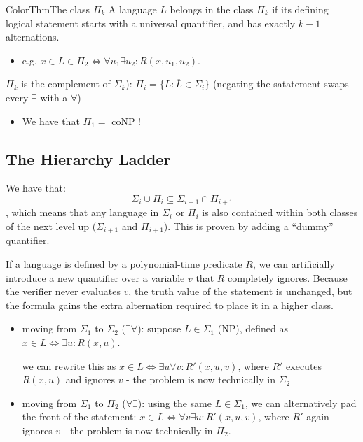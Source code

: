 \documentclass[a4paper, 11pt]{report}
\begin{document}
\begin{cframe}{ColorThm}{The class $\Pi_{k}$}{}
A language $L$ belongs in the class $\Pi_{k}$ if its defining logical statement starts with a universal quantifier, and has exactly $k-1$ alternations.
    \begin{itemize}
        \item e.g. $x \in L \in \Pi_{2} \iff \forall u_1 \exists u_2 : R(x, u_1, u_2)$.
    \end{itemize}

$\Pi_{k}$ is the complement of $\Sigma_{k}$): $\Pi_{i} = \{L : \overline{L} \in \Sigma_{i}\}$ (negating the satatement swaps every $\exists  $ with a $\forall  $)
\end{cframe}

\begin{itemize}
    \item We have that $\Pi_{1} =$ coNP !
\end{itemize}

\subsection{The Hierarchy Ladder}
We have that:
$$\Sigma_i \cup \Pi_i \subseteq \Sigma_{i+1} \cap \Pi_{i+1}$$
, which means that any language in $\Sigma_i$ or $\Pi_i$ is also contained within both classes of the next level up ($\Sigma_{i+1}$ and $\Pi_{i+1}$). This is proven by adding a ``dummy'' quantifier.

If a language is defined by a polynomial-time predicate $R$, we can artificially introduce a new quantifier over a variable $v$ that $R$ completely ignores. Because the verifier never evaluates $v$, the truth value of the statement is unchanged, but the formula gains the extra alternation required to place it in a higher class.

\begin{itemize}
\item moving from $\Sigma_1$ to $\Sigma_2$ ($\exists \forall$): 
    \subitem suppose $L \in \Sigma_1$ (NP), defined as $x \in L \iff \exists u : R(x, u)$. 
    
    we can rewrite this as $x \in L \iff \exists u \forall v : R'(x, u, v)$, where $R'$ executes $R(x,u)$ and ignores $v$ - the problem is now technically in $\Sigma_2$
    
\item moving from $\Sigma_1$ to $\Pi_2$ ($\forall \exists$):
    \subitem using the same $L \in \Sigma_1$, we can alternatively pad the front of the statement: $x \in L \iff \forall v \exists u : R'(x, u, v)$, where $R'$ again ignores $v$ - the problem is now technically in $\Pi_2$.
\end{itemize}
\end{document}
